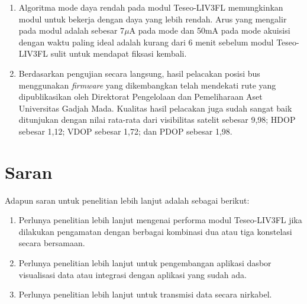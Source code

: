 \begin{enumerate}
	\item Algoritma mode daya rendah pada modul Teseo\hyp{}LIV3FL memungkinkan modul untuk bekerja dengan daya yang lebih rendah. Arus yang mengalir pada modul adalah sebesar 7$\mu$A pada mode  dan 50mA pada mode akuisisi dengan waktu \textit{} paling ideal adalah kurang dari 6 menit sebelum modul Teseo\hyp{}LIV3FL sulit untuk mendapat fiksasi kembali.
	
	\item Berdasarkan pengujian secara langsung, hasil pelacakan posisi bus menggunakan \textit{firmware} yang dikembangkan telah mendekati rute yang dipublikasikan oleh Direktorat Pengelolaan dan Pemeliharaan Aset Universitas Gadjah Mada. Kualitas hasil pelacakan juga sudah sangat baik ditunjukan dengan nilai rata-rata dari visibilitas satelit sebesar 9,98; HDOP sebesar 1,12; VDOP sebesar 1,72; dan PDOP sebesar 1,98.
\end{enumerate}
\section{Saran}
Adapun saran untuk penelitian lebih lanjut adalah sebagai berikut:
\begin{enumerate}
	\item Perlunya penelitian lebih lanjut mengenai performa modul Teseo-LIV3FL jika dilakukan pengamatan dengan berbagai kombinasi dua atau tiga konstelasi secara bersamaan.
	
	\item Perlunya penelitian lebih lanjut untuk pengembangan aplikasi dasbor visualisasi data atau integrasi dengan aplikasi yang sudah ada.
	
	\item Perlunya penelitian lebih lanjut untuk transmisi data secara nirkabel.
\end{enumerate}


